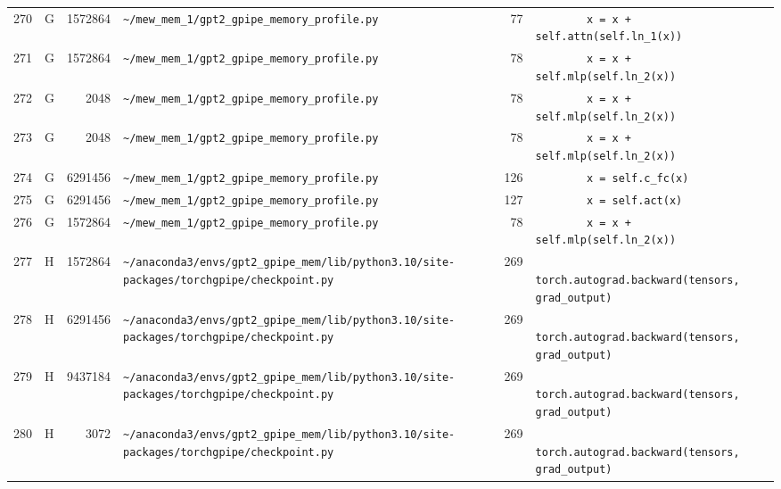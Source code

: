 \documentclass{article}
\begin{document}
\begin{longtable}{r l r p{6.5cm} r p{7.0cm}}
270 & G & 1572864 & \lstinline|~/mew_mem_1/gpt2_gpipe_memory_profile.py| & 77 & \lstinline|        x = x + self.attn(self.ln_1(x))| \\
271 & G & 1572864 & \lstinline|~/mew_mem_1/gpt2_gpipe_memory_profile.py| & 78 & \lstinline|        x = x + self.mlp(self.ln_2(x))| \\
272 & G & 2048 & \lstinline|~/mew_mem_1/gpt2_gpipe_memory_profile.py| & 78 & \lstinline|        x = x + self.mlp(self.ln_2(x))| \\
273 & G & 2048 & \lstinline|~/mew_mem_1/gpt2_gpipe_memory_profile.py| & 78 & \lstinline|        x = x + self.mlp(self.ln_2(x))| \\
274 & G & 6291456 & \lstinline|~/mew_mem_1/gpt2_gpipe_memory_profile.py| & 126 & \lstinline|        x = self.c_fc(x)| \\
275 & G & 6291456 & \lstinline|~/mew_mem_1/gpt2_gpipe_memory_profile.py| & 127 & \lstinline|        x = self.act(x)| \\
276 & G & 1572864 & \lstinline|~/mew_mem_1/gpt2_gpipe_memory_profile.py| & 78 & \lstinline|        x = x + self.mlp(self.ln_2(x))| \\
277 & H & 1572864 & \lstinline|~/anaconda3/envs/gpt2_gpipe_mem/lib/python3.10/site-packages/torchgpipe/checkpoint.py| & 269 & \lstinline|            torch.autograd.backward(tensors, grad_output)| \\
278 & H & 6291456 & \lstinline|~/anaconda3/envs/gpt2_gpipe_mem/lib/python3.10/site-packages/torchgpipe/checkpoint.py| & 269 & \lstinline|            torch.autograd.backward(tensors, grad_output)| \\
279 & H & 9437184 & \lstinline|~/anaconda3/envs/gpt2_gpipe_mem/lib/python3.10/site-packages/torchgpipe/checkpoint.py| & 269 & \lstinline|            torch.autograd.backward(tensors, grad_output)| \\
280 & H & 3072 & \lstinline|~/anaconda3/envs/gpt2_gpipe_mem/lib/python3.10/site-packages/torchgpipe/checkpoint.py| & 269 & \lstinline|            torch.autograd.backward(tensors, grad_output)| \\
\end{longtable}
\end{document}
